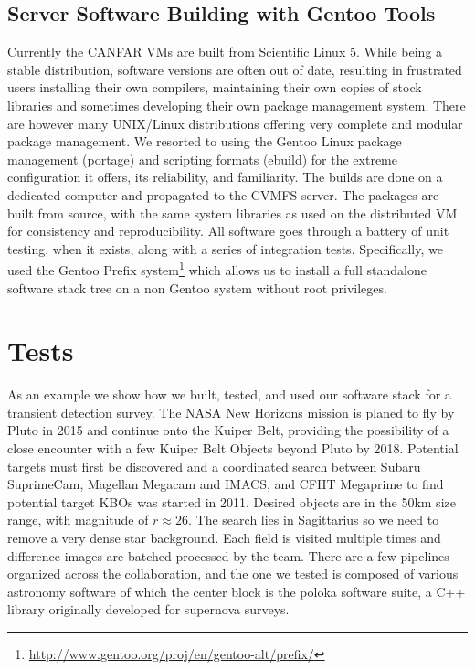 \subsection{Server Software Building with Gentoo Tools}
Currently the CANFAR VMs are built from Scientific Linux 5. While being a stable distribution, software versions are often out of date, resulting in frustrated users installing their own compilers, maintaining their own copies of stock libraries and sometimes developing their own package management system. There are however many UNIX/Linux distributions offering very complete and modular package management. We resorted to using the Gentoo Linux package management (portage) and scripting formats (ebuild) for the extreme configuration it offers, its reliability, and familiarity. The builds are done on a dedicated computer and propagated to the CVMFS server. The packages are built from source, with the same system libraries as used on the distributed VM for consistency and reproducibility. All software goes through a battery of unit testing, when it exists, along with a series of integration tests. Specifically, we used the Gentoo Prefix system\footnote{\url{http://www.gentoo.org/proj/en/gentoo-alt/prefix/}} which allows us to install a full standalone software stack tree on a non Gentoo system without root privileges.

\section{Tests}

As an example we show how we built, tested, and used our software stack for a transient detection survey. The NASA New Horizons mission is planed to fly by Pluto in 2015 and continue onto the Kuiper Belt, providing the possibility of a close encounter with a few Kuiper Belt Objects beyond Pluto by 2018. Potential targets must first be discovered and a coordinated search between Subaru SuprimeCam, Magellan Megacam and IMACS, and CFHT Megaprime to find potential target KBOs was started in 2011. Desired objects are in the 50km size range, with magnitude of $r\approx 26$. The search lies in Sagittarius so we need to remove a very dense star background. Each field is visited multiple times and difference images are batched-processed by the team. There are a few pipelines organized across the collaboration, and the one we tested is composed of various astronomy software of which the center block is the poloka software suite, a C++ library originally developed for supernova surveys.


